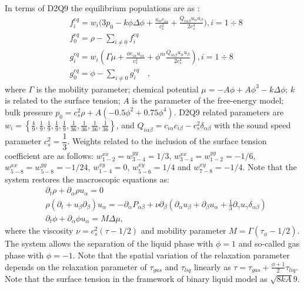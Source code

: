 \documentclass{article}
\begin{document}
In terms of D2Q9 the equilibrium populations are as \cite{pooley-contact}:
\begin{equation}
\begin{aligned}
&f_i^{eq}=w_i 
\biggl(3
p_0 - k \phi \Delta \phi
+\frac{u_{\alpha}c_{i\alpha}}{c_s^2}+\frac{Q_{i\alpha\beta}u_{\alpha } u_ {
\beta}}{2 c_s^4}\biggr), i=1\div8\\
&f_0^{eq}=\rho-\sum_{i\neq0}{f_i^{eq}}\\
&g_i^{eq}=w_i(\Gamma \mu + \frac{\phi c_{i\alpha} u_{i\alpha}}{c_s^2}+\phi^m
\frac{Q_{i\alpha\beta}u_{\alpha}u_{\beta}}{2 c_s^4}), i=1\div8 \\
&g_0^{eq}=\phi-\sum_{i\neq0}{g_i^{eq}}\quad,
\end{aligned}
\end{equation}
where $\Gamma$ is the mobility parameter; chemical potential
$\mu=-A\phi+A\phi^3-k\Delta\phi$; $k$ is related to the surface
tension; $A$ is the parameter of the free-energy model; bulk pressure
$p_0=c_s^2 \rho +A (-0.5 \phi^2+0.75 \phi^4)$. D2Q9 related parameters are
$w_i=\left\{\frac{4}{9},\frac{1}{9},\frac{1}{9},\frac{1}{9},\frac{1}{9},
\frac{1}{36},\frac{1}{36},\frac{1}{36},\frac{1}{36}\right\}$, and
$Q_{i\alpha\beta}=c_{i\alpha} c_{i\beta} - c_s^2 \delta_{\alpha\beta}$ with
the sound speed parameter $c_s^2=\dfrac{1}{3}$. Weights related to the
inclusion of the surface tension coefficient are as follows:
$w^{xx}_{1-2}=w^{yy}_{3-4}=1/3$, $w^{xx}_{3-4}=w^{yy}_{1-2}=-1/6$,
$w^{xx}_{5-8}=w^{yy}_{5-8}=-1/24$, $w^{xy}_{1-4}=0$, $w^{xy}_{5-6}=1/4$ and
$w^{xy}_{7-8}=-1/4$. Note that the system restores the macroscopic
equations as:
\begin{equation}
\begin{aligned}
&\partial_t \rho+ \partial_{\alpha} \rho u_{\alpha}=0\\
&\rho\left(\partial_t+u_{\beta}\partial_{\beta}\right) u_{\alpha}=
-\partial_{\alpha}P_{\alpha \beta} +
\nu\partial_{\beta}\left(\partial_{\alpha}u_{\beta}+\partial_{\beta} u_{\alpha}
+ \frac{1}{3}\partial_{\gamma} u_{\gamma} \delta_{\alpha\beta}\right)\\
&\partial_t \phi + \partial_{\alpha} \phi u_{\alpha}=M \Delta \mu,
\end{aligned}
\label{binary:fluid:system}
\end{equation}
where the viscosity $\nu=c_s^2 (\tau-1/2)$ and mobility parameter
$M=\Gamma(\tau_{\phi}-1/2)$. The system allows the separation of the liquid
phase with $\phi=1$ and so-called gas phase with $\phi=-1$. Note that the
spatial variation of the relaxation parameter depends on the relaxation
parameter of $\tau_{gas}$ and $\tau_{liq}$ linearly as
$\tau=\tau_{gas}+\frac{\phi+1}{2}\tau_{liq}$. Note that the surface tension in
the framework of binary liquid model as $\sqrt{8 k A}{9}$.
\end{document}
